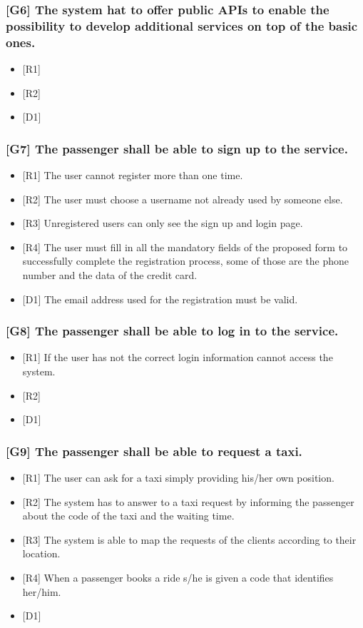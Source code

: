\documentclass[a4paper,11pt]{report} %
\begin{document}
	\subsubsection{{[}G6{]} The system hat to offer public APIs to enable the possibility to develop additional services on top of the basic ones.}
	\begin{itemize}
		\item {[}R1{]}
		\item {[}R2{]}
		\item {[}D1{]}
	\end{itemize}
		
	\subsubsection{{[}G7{]} The passenger shall be able to sign up to the service.}
	\begin{itemize}
		\item {[}R1{]} The user cannot register more than one time.
		\item {[}R2{]} The user must choose a username not already used by someone else.
		\item {[}R3{]} Unregistered users can only see the sign up and login page.
		\item {[}R4{]} The user must fill in all the mandatory fields of the proposed form to successfully complete the registration process, some of those are the phone number and the data of the credit card.
		\item {[}D1{]} The email address used for the registration must be valid.
	\end{itemize}
		
	\subsubsection{{[}G8{]} The passenger shall be able to log in to the service.}
	\begin{itemize}
		\item {[}R1{]} If the user has not the correct login information cannot access the system.
		\item {[}R2{]} 
		\item {[}D1{]}
	\end{itemize}
		
	\subsubsection{{[}G9{]} The passenger shall be able to request a taxi.}
	\begin{itemize}
		\item {[}R1{]} The user can ask for a taxi simply providing his/her own position.
		\item {[}R2{]} The system has to answer to a taxi request by informing the passenger about the code of the taxi and the waiting time.
		\item {[}R3{]} The system is able to map the requests of the clients according to their location.
		\item {[}R4{]} When a passenger books a ride s/he is given a code that identifies her/him.
		\item {[}D1{]}
	\end{itemize}
	
\end{document}
